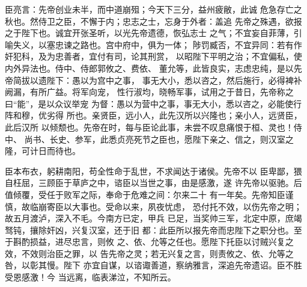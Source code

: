 \documentclass[preview]{standalone}
\begin{document}
{
    臣亮言：先帝创业未半，而中道崩殂；今天下三分，益州疲敝，此诚
危急存亡之秋也。然侍卫之臣，不懈于内；忠志之士，忘身于外者：盖追
先帝之殊遇，欲报之于陛下也。诚宜开张圣听，以光先帝遗德，恢弘志士
之气；不宜妄自菲薄，引喻失义，以塞忠谏之路也。宫中府中，俱为一体；
陟罚臧否，不宜异同：若有作奸犯科，及为忠善者，宜付有司，论其刑赏，
以昭陛下平明之治；不宜偏私，使内外异法也。侍中、侍郎郭攸之、费依、
董允等，此皆良实，志虑忠纯，是以先帝简拔以遗陛下：愚以为宫中之事，
事无大小，悉以咨之，然后施行，必得裨补阙漏，有所广益。将军向宠，
性行淑均，晓畅军事，试用之于昔日，先帝称之曰“能”，是以众议举宠
为督：愚以为营中之事，事无大小，悉以咨之，必能使行阵和穆，优劣得
所也。亲贤臣，远小人，此先汉所以兴隆也；亲小人，远贤臣，此后汉所
以倾颓也。先帝在时，每与臣论此事，未尝不叹息痛恨于桓、灵也！侍中、
尚书、长史、参军，此悉贞亮死节之臣也，愿陛下亲之、信之，则汉室之
隆，可计日而待也。

    臣本布衣，躬耕南阳，苟全性命于乱世，不求闻达于诸侯。先帝不以
臣卑鄙，猥自枉屈，三顾臣于草庐之中，谘臣以当世之事，由是感激，遂
许先帝以驱驰。后值倾覆，受任于败军之际，奉命于危难之间：尔来二十
有一年矣。先帝知臣谨慎，故临崩寄臣以大事也。受命以来，夙夜忧虑，
恐付托不效，以伤先帝之明；故五月渡泸，深入不毛。今南方已定，甲兵
已足，当奖帅三军，北定中原，庶竭驽钝，攘除奸凶，兴复汉室，还于旧
都：此臣所以报先帝而忠陛下之职分也。至于斟酌损益，进尽忠言，则攸
之、依、允等之任也。愿陛下托臣以讨贼兴复之效，不效则治臣之罪，以
告先帝之灵；若无兴复之言，则责攸之、依、允等之咎，以彰其慢。陛下
亦宜自谋，以谘诹善道，察纳雅言，深追先帝遗诏。臣不胜受恩感激！今
当远离，临表涕泣，不知所云。}
\end{document}
